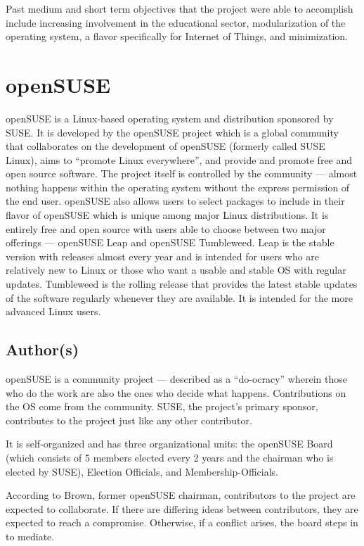 \documentclass{article}
\begin{document}
Past medium and short term objectives that the project were able to accomplish
include increasing involvement in the educational sector, modularization of the
operating system, a flavor specifically for Internet of Things, and
minimization. \parencite{fedora_objective}

\section{openSUSE}
openSUSE is a Linux-based operating system and distribution sponsored by SUSE.
It is developed by the openSUSE project which is a global community that
collaborates on the development of openSUSE (formerly called SUSE Linux), aims
to ``promote Linux everywhere'', and provide and promote free and open source
software. The project itself is controlled by the community --- almost nothing
happens within the operating system without the express permission of the end
user. openSUSE also allows users to select packages to include in their flavor
of openSUSE which is unique among major Linux distributions. It is entirely free
and open source with users able to choose between two major offerings --- openSUSE
Leap and openSUSE Tumbleweed. Leap is the stable version with releases almost
every year and is intended for users who are relatively new to Linux or those
who want a usable and stable OS with regular updates. Tumbleweed is the rolling
release that provides the latest stable updates of the software regularly
whenever they are available. It is intended for the more advanced Linux users.

\subsection{Author(s)}
openSUSE is a community project --- described as a “do-ocracy” wherein those who
do the work are also the ones who decide what happens. Contributions on the OS
come from the community. SUSE, the project’s primary sponsor, contributes to the
project just like any other contributor.

It is self-organized and has three organizational units: the openSUSE Board
(which consists of 5 members elected every 2 years and the chairman who is
elected by SUSE), Election Officials, and Membership-Officials.

According to Brown, former openSUSE chairman, contributors to the project are
expected to collaborate. If there are differing ideas between contributors, they
are expected to reach a compromise. Otherwise, if a conflict arises, the board
steps in to mediate.
\end{document}
